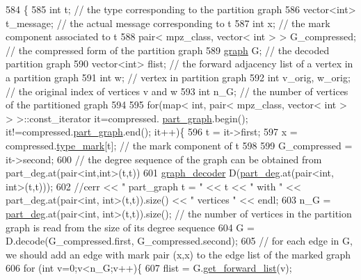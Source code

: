 \begin{DoxyCode}
584 \{
585   \textcolor{keywordtype}{int} t; \textcolor{comment}{// the type corresponding to the partition graph}
586   vector<int> t\_message; \textcolor{comment}{// the actual message corresponding to t}
587   \textcolor{keywordtype}{int} x; \textcolor{comment}{// the mark component associated to t}
588   pair< mpz\_class, vector< int > > G\_compressed; \textcolor{comment}{// the compressed form of the partition graph}
589   \hyperlink{classgraph}{graph} G; \textcolor{comment}{// the decoded partition graph}
590   vector<int> flist; \textcolor{comment}{// the forward adjacency list of a vertex in a partition graph}
591   \textcolor{keywordtype}{int} w; \textcolor{comment}{// vertex in partition graph}
592   \textcolor{keywordtype}{int} v\_orig, w\_orig; \textcolor{comment}{// the original index of vertices v and w}
593   \textcolor{keywordtype}{int} n\_G; \textcolor{comment}{// the number of vertices of the partitioned graph }
594 
595   \textcolor{keywordflow}{for}(map< \textcolor{keywordtype}{int}, pair< mpz\_class, vector< int > > >::const\_iterator it=compressed.
      \hyperlink{classmarked__graph__compressed_ae179a4737e6eab905c18a94d44ef64b7}{part\_graph}.begin(); it!=compressed.\hyperlink{classmarked__graph__compressed_ae179a4737e6eab905c18a94d44ef64b7}{part\_graph}.end(); it++)\{
596     t = it->first;
597     x = compressed.\hyperlink{classmarked__graph__compressed_a86b00223525703e973415cbc9c94da68}{type\_mark}[t]; \textcolor{comment}{// the mark component of t }
598 
599     G\_compressed = it->second;
600     \textcolor{comment}{// the degree sequence of the graph can be obtained from part\_deg.at(pair<int,int>(t,t))}
601     \hyperlink{classgraph__decoder}{graph\_decoder} D(\hyperlink{classmarked__graph__decoder_a6882e96fcad9abb10e72f1398814824a}{part\_deg}.at(pair<int, int>(t,t)));
602     \textcolor{comment}{//cerr << " part\_graph t = " << t << " with " << part\_deg.at(pair<int, int>(t,t)).size() << " vertices
       " << endl;}
603     n\_G = \hyperlink{classmarked__graph__decoder_a6882e96fcad9abb10e72f1398814824a}{part\_deg}.at(pair<int, int>(t,t)).size(); \textcolor{comment}{// the number of vertices in the partition graph
       is read from the size of its degree sequence}
604     G = D.decode(G\_compressed.first, G\_compressed.second);
605     \textcolor{comment}{// for each edge in G, we should add an edge with mark pair (x,x) to the edge list of the marked graph}
606     \textcolor{keywordflow}{for} (\textcolor{keywordtype}{int} v=0;v<n\_G;v++)\{
607       flist = G.\hyperlink{classgraph_aa8fbee52a7b3604dbbd9175040c7ead5}{get\_forward\_list}(v);

\end{DoxyCode}
